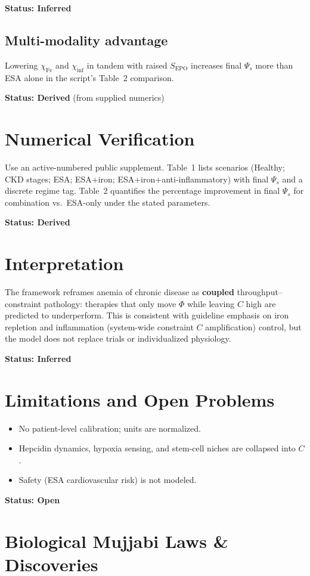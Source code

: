 \documentclass[11pt]{article}
\begin{document}
\textbf{Status: Inferred}

\subsection{Multi-modality advantage}
Lowering $\chi_{\mathrm{Fe}}$ and $\chi_{\mathrm{inf}}$ in tandem with raised $S_{\mathrm{EPO}}$ increases final $\Psi_s$ more than ESA alone in the script's Table~2 comparison.

\textbf{Status: Derived} (from supplied numerics)

\section{Numerical Verification}
Use an active-numbered public supplement. Table~1 lists scenarios (Healthy; CKD stages; ESA; ESA+iron; ESA+iron+anti-inflammatory) with final $\Psi_s$ and a discrete regime tag. Table~2 quantifies the percentage improvement in final $\Psi_s$ for combination vs.\ ESA-only under the stated parameters.

\textbf{Status: Derived}

\section{Interpretation}
The framework reframes anemia of chronic disease as \textbf{coupled} throughput--constraint pathology: therapies that only move $\Phi$ while leaving $C$ high are predicted to underperform. This is consistent with guideline emphasis on iron repletion and inflammation (system-wide constraint $C$ amplification) control, but the model does not replace trials or individualized physiology.

\textbf{Status: Inferred}

\section{Limitations and Open Problems}
\begin{itemize}
  \item No patient-level calibration; units are normalized.
  \item Hepcidin dynamics, hypoxia sensing, and stem-cell niches are collapsed into $C$.
  \item Safety (ESA cardiovascular risk) is not modeled.
\end{itemize}

\textbf{Status: Open}


\section{Biological Mujjabi Laws \& Discoveries}
\end{document}

